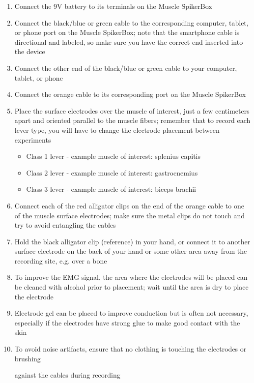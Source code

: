 \documentclass{article}
\begin{document}
\begin{enumerate}
\item Connect the 9V battery to its terminals on the Muscle SpikerBox


\item Connect the black/blue or green cable to the corresponding computer, tablet, or phone port on the Muscle SpikerBox; note that the smartphone cable is directional and labeled, so make sure you have the correct end inserted into the device


\item Connect the other end of the black/blue or green cable to your computer, tablet, or phone


\item Connect the orange cable to its corresponding port on the Muscle SpikerBox


\item Place the surface electrodes over the muscle of interest, just a few centimeters apart and oriented parallel to the muscle fibers; remember that to record each lever type, you will have to change the electrode placement between experiments

\begin{itemize}
\item Class 1 lever - example muscle of interest: splenius capitis
\item Class 2 lever - example muscle of interest: gastrocnemius
\item Class 3 lever - example muscle of interest: biceps brachii
\end{itemize}


\item Connect each of the red alligator clips on the end of the orange cable to one of the muscle surface electrodes; make sure the metal clips do not touch and try to avoid entangling the cables


\item Hold the black alligator clip (reference) in your hand, or connect it to another surface electrode on the back of your hand or some other area away from the recording site, e.g. over a bone


\item To improve the EMG signal, the area where the electrodes will be placed can be cleaned with alcohol prior to placement; wait until the area is dry to place the electrode


\item Electrode gel can be placed to improve conduction but is often not necessary, especially if the electrodes have strong glue to make good contact with the skin


\item To avoid noise artifacts, ensure that no clothing is touching the electrodes or brushing

against the cables during recording
\end{enumerate}
\end{document}
